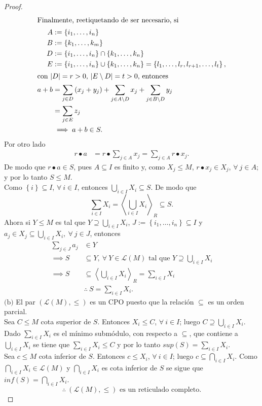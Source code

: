 \documentclass{article}
\newcommand{\crdnlty}[1]{
	\left|#1\right|
}
\newcommand{\lrprth}[1]{
	\left(#1\right)
}
\newcommand{\lrbrack}[1]{
	\left\{#1\right\}
}
\newcommand{\gengroup}[1]{
	\left< #1\right>
}
\newcommand{\genlin}[1]{
	\mathscr{L}\lrprth{#1}
}
\theoremstyle{definition}
\theoremstyle{plain}
\theoremstyle{plain}
\theoremstyle{definition}
\theoremstyle{definition}
\theoremstyle{definition}
\theoremstyle{definition}
\theoremstyle{definition}
\theoremstyle{definition}
\begin{document}
\begin{enumerate}[label=\textbf{Ej \arabic*.}]
\begin{proof}
\begin{align*}
		\intertext{Finalmente, reetiquetando de ser necesario, si}
		A&:=\lrbrack{i_1,\dotsc,i_n}\\
		B&:=\lrbrack{k_1,\dotsc,k_m}\\
		D&:=\lrbrack{i_1,\dotsc,i_n}\cap
		\lrbrack{k_1,\dotsc,k_n}\\
		E&:=\lrbrack{i_1,\dotsc,i_n}\cup
		\lrbrack{k_1,\dotsc,k_n}=\lrbrack{l_1,\dotsc,l_{r},l_{r+1},\dotsc,l_{t}},\\
		\intertext{con $\crdnlty{D}=r>0$, $\crdnlty{E\setminus D}=t>0$, entonces}
		a+b&=\sum_{j\in D}\lrprth{x_j+y_j}+\sum_{j\in A\setminus D}x_j+\sum_{j\in B\setminus D}y_j \\
		&=\sum_{j\in E}z_j\\
		&\implies a+b\in S.
	\end{align*}
	Por otro lado
	\begin{align*}
		r\bullet a&=r\bullet\sum_{j\in A}x_j=\sum_{j\in A}r\bullet x_j.
	\end{align*}
	De modo que $r\bullet a\in S$, pues $A\subseteq I$ es finito y, como $X_j\leq M$, $r\bullet x_j\in X_j$, $\forall\ j\in A$; y por lo tanto $S\leq M$. \\
	Como $\lrbrack{i}\subseteq I$, $\forall\ i\in I$, entonces
	$\bigcup_{i\in I}X_i\subseteq S$. De modo que
	\begin{equation*}
		\sum_{i\in I}X_i=\gengroup{\bigcup_{i\in I}X_i}_R\subseteq S.
	\end{equation*}
	Ahora si $Y\leq M$ es tal que $Y\supseteq \bigcup_{i\in I}X_i$, $J:=\lrbrack{i_1,\dotsc,i_n}\subseteq I$ y $a_j\in X_j\subseteq\bigcup_{i\in I}X_i,\ \forall\ j\in J$, entonces
	\begin{align*}
		\sum_{j\in J}a_j&\in Y\\
		\implies S&\subseteq Y,\ \forall\ Y\in\genlin{M}\text{ tal que } Y\supseteq \bigcup_{i\in I}X_i\\
		\implies S&\subseteq \gengroup{\bigcup_{i\in I}X_i}_R=\sum_{i\in I}X_i\\
		&\therefore\ S=\sum_{i\in I}X_i.
	\end{align*}
	$\boxed{\text{(b)}}$ El par $(\genlin{M},\leq)$ es un CPO puesto que la relación $\subseteq$ es un orden parcial.\\
	Sea $C\leq M$ cota superior de $S$. Entonces $X_i\leq C$, $\forall\ i\in I$; luego $C\supseteq \bigcup_{i\in I}X_i$. Dado $\sum_{i\in I}X_i$ es el mínimo submódulo, con respecto a $\subseteq$, que contiene a $\bigcup_{i\in I}X_i$ se tiene que $\sum_{i\in I}X_i\leq C$ y por lo tanto $sup\lrprth{S}=\sum_{i\in I}X_i$.\\
	Sea $c\leq M$ cota inferior de $S$. Entonces $c\leq X_i$, $\forall\ i\in I$; luego $c\subseteq \bigcap_{i\in I}X_i$. Como $\bigcap_{i\in I}X_i\in\genlin{M}$ y $\bigcap_{i\in I}X_i$ es cota inferior de $S$ se sigue que $inf\lrprth{S}=\bigcap_{i\in I}X_i$.
	\begin{equation*}
		\therefore\ \lrprth{\genlin{M},\leq}\text{ es un reticulado completo.}
	\end{equation*}
\end{proof}


\end{enumerate}
\end{document}
